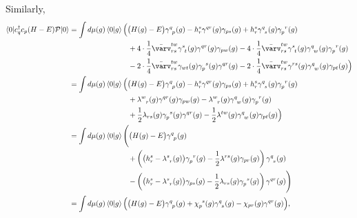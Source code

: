 \documentclass[11pt,letterpaper]{article}
\begin{document}
Similarly,
\begin{subequations}
\begin{align}
  \nonumber
  \braket{0|c^\dag_q c_p (H - E)\mathcal{P}|0}
  &= \int d\mu(g) \braket{0|g}
  \Bigl(
    \big(H(g) - E\big) {\gamma}_{\phantom{q}p}^{q\phantom{p}}(g)
    - h^{s}_{r} \gamma^{qr}(g) \gamma_{ps}(g)
    + h^{s}_{r} \gamma^{q\phantom{s}}_{\phantom{q}s}(g) \gamma^{\phantom{p}r}_{p\phantom{r}}(g)\\
    \nonumber
    &\hspace{8em}
    + 4 \cdot \frac{1}{4} \bar\varv^{tw}_{rs}
    \gamma^{s\phantom{t}}_{\phantom{s}t}(g) \gamma^{qr}(g) \gamma_{pw}(g) 
    - 4 \cdot \frac{1}{4} \bar\varv^{tw}_{rs}
    \gamma^{s\phantom{t}}_{\phantom{s}t}(g) \gamma^{q\phantom{w}}_{\phantom{q}w}(g) \gamma_{p\phantom{r}}^{\phantom{p}r}(g)\\
    &\hspace{8em}
    - 2 \cdot \frac{1}{4} \bar\varv^{tw}_{rs}
    \gamma_{wt}(g) \gamma^{\phantom{p}s}_{p\phantom{s}}(g) \gamma^{qr}(g)
    - 2 \cdot \frac{1}{4} \bar\varv^{tw}_{rs}
    \gamma^{rs}(g) \gamma^{q\phantom{w}}_{\phantom{q}w}(g) \gamma_{pt}(g) 
  \Bigr)\\
  \nonumber
  &= \int d\mu(g) \braket{0|g}
  \Bigl(
    \big(H(g) - E\big) {\gamma}_{\phantom{q}p}^{q\phantom{p}}(g)
    -h^{s}_{r}\gamma^{qr}(g)\gamma_{ps}(g)+h^{s}_{r}\gamma^{q\phantom{s}}_{\phantom{q}s}(g)\gamma^{\phantom{p}r}_{p\phantom{r}}(g)\\
    \nonumber
    &\hspace{8em}+ \lambda^{w\phantom{r}}_{\phantom{w}r}(g) 
    \gamma^{qr}(g) \gamma_{pw}(g)
    - \lambda^{w\phantom{r}}_{\phantom{w}r}(g) 
    \gamma_{\phantom{q}w}^{q\phantom{w}}(g) \gamma^{\phantom{p}r}_{p\phantom{r}}(g)\\
    &\hspace{8em}+ \frac{1}{2} \lambda_{rs}(g)
    \gamma_{p\phantom{s}}^{\phantom{p}s}(g)
    \gamma^{qr}(g)
    - \frac{1}{2} \lambda^{tw}(g)
    \gamma^{q\phantom{w}}_{\phantom{q}w}(g)
    \gamma_{pt}(g)
  \Bigr)\\
  \nonumber
  &= \int d\mu(g) \braket{0|g}
  \Biggl(
    \big(H(g) - E\big) {\gamma}_{\phantom{q}p}^{q\phantom{p}}(g)\\
    \nonumber
    &\hspace{8em}
    + \left(
      \big(h_r^s - \lambda^{s\phantom{r}}_{\phantom{s}r}(g)\big)
      \gamma_{p\phantom{r}}^{\phantom{p}r}(g)
      - \frac{1}{2} \lambda^{rs}(g) \gamma_{pr}(g)
    \right)
    \gamma_{\phantom{q}s}^{q\phantom{s}}(g)\\
    &\hspace{8em}
    - \left(
      \big(h_r^s - \lambda^{s\phantom{r}}_{\phantom{s}r}(g)\big)
      \gamma_{ps}(g)
      - \frac{1}{2} \lambda_{rs}(g) \gamma_{p\phantom{s}}^{\phantom{p}s}(g)
    \right)
    \gamma^{qr}(g)
  \Biggr)\\
  &= \int d\mu(g) \braket{0|g}
  \Big(
    \big(H(g) - E\big) {\gamma}_{\phantom{q}p}^{q\phantom{p}}(g)
    + \chi_{p\phantom{s}}^{\phantom{p}s}(g) \gamma_{\phantom{q}s}^{q\phantom{s}}(g)
    - \chi_{pr}(g) \gamma^{qr}(g)
  \Big),
\end{align}
\end{subequations}
\end{document}
